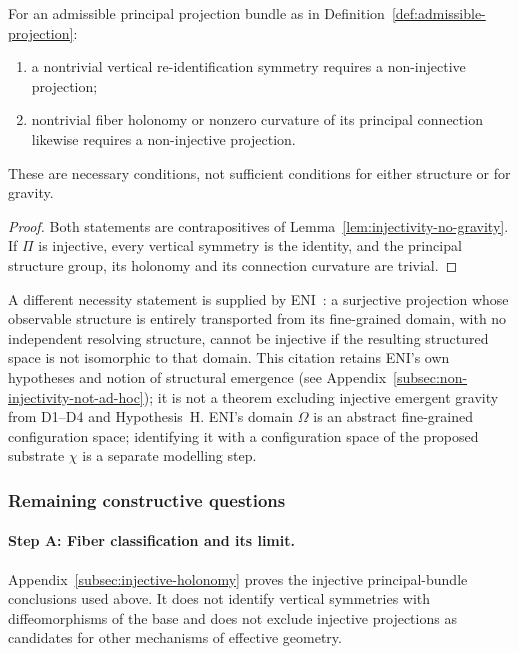     \begin{proposition}
      \label{thm:necessity}
      For an admissible principal projection bundle as in Definition~\ref{def:admissible-projection}:
      \begin{enumerate}[label=(\alph*)]
        \item \label{thm:a}
        a nontrivial vertical re-identification symmetry requires a non-injective projection;
        \item \label{thm:b}
        nontrivial fiber holonomy or nonzero curvature of its principal connection likewise requires
        a non-injective projection.
      \end{enumerate}
      These are necessary conditions, not sufficient conditions for either structure or for gravity.
    \end{proposition}

    \begin{proof}
      Both statements are contrapositives of Lemma~\ref{lem:injectivity-no-gravity}.
      If $\Pi$ is injective, every vertical symmetry is the identity, and the principal structure group,
      its holonomy and its connection curvature are trivial.
    \end{proof}

    A different necessity statement is supplied by ENI~\cite{Beau2026l}:
    a surjective projection whose observable structure is entirely transported from its fine-grained domain,
    with no independent resolving structure, cannot be injective if the resulting structured space is not
    isomorphic to that domain.
    This citation retains ENI's own hypotheses and notion of structural emergence
    (see Appendix~\ref{subsec:non-injectivity-not-ad-hoc}); it is not a theorem excluding injective emergent gravity
    from D1--D4 and Hypothesis~H.
    ENI's domain $\Omega$ is an abstract fine-grained configuration space;
    identifying it with a configuration space of the proposed substrate $\chi$ is a separate modelling step.

  \subsubsection*{Remaining constructive questions}
    \label{subsec:necessity-open}

    \paragraph{Step A: Fiber classification and its limit.}
      Appendix~\ref{subsec:injective-holonomy} proves the injective principal-bundle conclusions used above.
      It does not identify vertical symmetries with diffeomorphisms of the base and does not exclude
      injective projections as candidates for other mechanisms of effective geometry.

